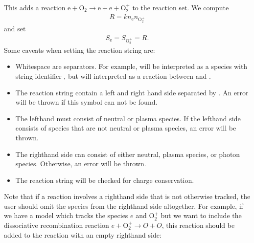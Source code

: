 \documentclass[letterpaper,10pt,english]{sphinxmanual}
\begin{document}
\sphinxAtStartPar
This adds a reaction \(\textrm{e} + \textrm{O}_2 \rightarrow \textrm{e} + \textrm{e} + \textrm{O}_2^+\) to the reaction set.
We compute
\begin{equation*}
\begin{split}R = kn_{\textrm{e}}n_{\textrm{O}_2^+}\end{split}
\end{equation*}
\sphinxAtStartPar
and set
\begin{equation*}
\begin{split}S_{\textrm{e}} = S_{\textrm{O}_2^+} = R.\end{split}
\end{equation*}
\sphinxAtStartPar
Some caveats when setting the reaction string are:
\begin{itemize}
\item {} 
\sphinxAtStartPar
Whitespace are separators.
For example,  will be interpreted as a species with string identifier , but  will interpreted as a reaction between  and .

\item {} 
\sphinxAtStartPar
The reaction string  contain a left and right hand side separated by \sphinxcode{\sphinxupquote{\sphinxhyphen{}\textgreater{}}}.
An error will be thrown if this symbol can not be found.

\item {} 
\sphinxAtStartPar
The left\sphinxhyphen{}hand must consist  of neutral or plasma species.
If the left\sphinxhyphen{}hand side consists of species that are not neutral or plasma species, an error will be thrown.

\item {} 
\sphinxAtStartPar
The right\sphinxhyphen{}hand side can consist of either neutral, plasma species, or photon species.
Otherwise, an error will be thrown.

\item {} 
\sphinxAtStartPar
The reaction string will be checked for charge conservation.

\end{itemize}

\sphinxAtStartPar
Note that if a reaction involves a right\sphinxhyphen{}hand side that is not otherwise tracked, the user should omit the species from the right\sphinxhyphen{}hand side altogether.
For example, if we have a model which tracks the species \(e\) and \(\textrm{O}_2^+\) but we want to include the dissociative recombination reaction \(e + \textrm{O}_2^+ \rightarrow O + O\), this reaction should be added to the reaction with an empty right\sphinxhyphen{}hand side:
\end{document}

